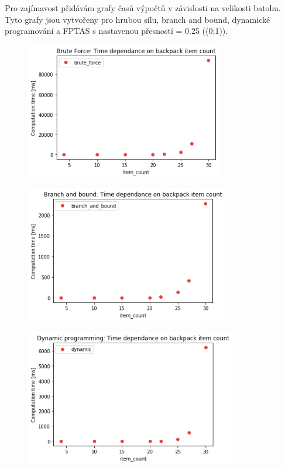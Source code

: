 \documentclass[a4paper,10pt,twocolumn]{article}
\begin{document}
Pro zajímavost přidávám grafy časů výpočtů v závislosti na velikosti batohu. Tyto grafy jsou vytvořeny pro hrubou sílu, branch and bound, dynamické programování a FPTAS s nastavenou přesností \varepsilon = 0.25 (\varepsilon \in (0;1)). 
\begin{figure}[H]
  \begin{center}
    \includegraphics[height=6cm]{graphs/bruteforce_speed.png}
  \end{center}
\end{figure}

\begin{figure}[H]
  \begin{center}
    \includegraphics[height=6cm]{graphs/bnb_speed.png}
  \end{center}
\end{figure}


\begin{figure}[H]
  \begin{center}
    \includegraphics[height=6cm]{graphs/dynamic_speed.png}
  \end{center}
\end{figure}
\end{document}

